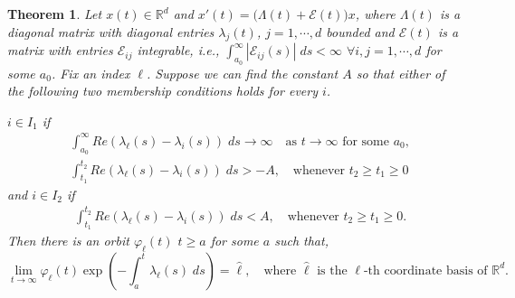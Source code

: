 \documentclass[a4paper,11pt]{article}
\newtheorem{theorem}{Theorem}
\theoremstyle{remark}
\begin{document}
\begin{theorem}{\cite[Diagonal Version]{CL1955}}\label{thm:CL} Let $x(t)\in \mathbb{R}^d$ and $x'(t) = \big(\Lambda(t) + \mathcal{E}(t)\big)x$, where $\Lambda(t)$ is a diagonal matrix with diagonal entries $\lambda_j(t)$, $j=1,\cdots,d$ bounded and $\mathcal{E}(t)$ is a matrix with entries $\mathcal{E}_{ij}$ integrable, i.e., $\int_{a_0}^\infty |\mathcal{E}_{ij}(s)|\; ds < \infty$ $\forall i,j=1,\cdots,d$ for some $a_0$.
Fix an index $\ell$. Suppose we can find the constant $A$ so that either of the following two membership conditions holds for every $i$.

$i \in I_1$ if
\begin{align}
 &\int_{a_0}^\infty Re(\lambda_\ell(s) -\lambda_i(s))\; ds \rightarrow \infty \quad \text{as $t \rightarrow \infty$ for some $a_0$},\label{eq:I1cond1}\\
 &\int_{t_1}^{t_2} Re(\lambda_\ell(s) -\lambda_i(s))\; ds > -A, \quad \text{whenever $t_2\ge t_1\ge 0$} \label{eq:I1cond2}
\end{align}
and $i \in I_2$ if
\begin{align}
 &\int_{t_1}^{t_2} Re(\lambda_\ell(s) -\lambda_i(s))\; ds < A, \quad \text{whenever $t_2\ge t_1\ge 0$}. \label{eq:I2cond}
\end{align}
Then there is an orbit $\varphi_\ell(t)$ $t\ge a$ for some $a$ such that,
\begin{equation}
 \lim_{t \rightarrow \infty} \varphi_\ell(t) \exp\left(-\int_{a}^t \lambda_\ell(s)\; ds\right) = \hat{\ell}, \quad \text{where $\hat{\ell}$ is the $\ell$-th coordinate basis of $\mathbb{R}^d$.}
\end{equation}
\end{theorem}
\end{document}
